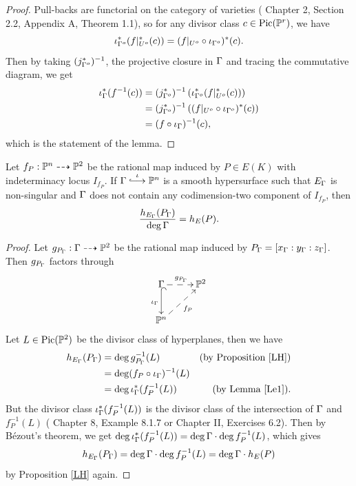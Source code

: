 \documentclass[12pt,reqno]{amsart}
\begin{document}
\begin{proof}
Pull-backs are functorial on the category of varieties (\cite{FIT} Chapter 2, Section 2.2, \cite{HAG} Appendix A, Theorem 1.1), so for any divisor class $c \in \operatorname{Pic}(\mathbb{P}^r)$, we have 
$$\iota_{\Gamma^o}^*(f|_{U^o}^*(c))=(f|_{U^o} \circ \iota_{\Gamma^o})^*(c). $$ Then by taking $(j_{\Gamma^o}^*)^{-1}$, the projective closure in $\Gamma$ and tracing the commutative diagram, we get
\begin{align*}
\iota_{\Gamma}^*(f^{-1}(c))&=(j_{\Gamma^o}^*)^{-1}\left(\iota_{\Gamma^o}^*(f|_{U^o}^*(c))\right) \\& = (j_{\Gamma^o}^*)^{-1}\left((f|_{U^o} \circ \iota_{\Gamma^o})^*(c)\right) \\ &= (f \circ \iota_\Gamma)^{-1}(c), \end{align*} which is the statement of the lemma.
\end{proof}

\begin{lemma} \label{leh}Let $f_P : \mathbb{P}^n \dashrightarrow \mathbb{P}^2$ be the rational map induced by $P \in E(K)$ with indeterminacy locus $I_{f_P}$. If $\G \stackrel{\iota}{\longhookrightarrow} \PP^n$ is a smooth hypersurface such that $E_\Gamma$ is non-singular and $\Gamma$ does not contain any codimension-two component of $I_{f_P}$, then 
\begin{equation}\frac{h_{E_\Gamma}(P_\Gamma)}{\deg \Gamma}= h_E(P). \label{E1}\end{equation}
\end{lemma}
\begin{proof} Let $g_{P_\Gamma} : \Gamma \dashrightarrow \mathbb{P}^2$ be the rational map induced by $P_\Gamma=[x_\Gamma: y_\Gamma: z_\Gamma]$. Then $g_{P_\Gamma}$ factors through
$$\xymatrix{
\G \ar@{-->}[r]^{g_{P_\G}} \ar@{^{(}->}[d]_{\iota_{\G}} 
&\PP^2  \\
\PP^n \ar@{-->}[ur]_{f_P} 
}$$
Let $L \in \operatorname{Pic}(\mathbb{P}^2)$ be the divisor class of hyperplanes, then we have 
\begin{align*}
h_{E_\Gamma}(P_\Gamma)&= \deg g_{P_\Gamma}^{-1}(L) & (\text{by Proposition \ref{LH}})\\
&=\deg (f_P \circ \iota_\Gamma)^{-1}(L)\\
&= \deg \iota_\Gamma^* (f_P^{-1}(L)) &(\text{by Lemma \ref{Le1}}).
\end{align*}
But the divisor class $\iota_\Gamma^* (f_P^{-1}(L))$ is the divisor class of the intersection of $\Gamma$ and $f_P^{-1}(L)$ (\cite{FIT} Chapter 8, Example 8.1.7 or \cite{HAG} Chapter II, Exercises 6.2). Then by B\'ezout's theorem, we get $\deg \iota_\Gamma^* (f_P^{-1}(L)) = \deg \Gamma \cdot \deg f_P^{-1}(L)$, which gives 
$$h_{E_\Gamma}(P_\Gamma)=\deg \Gamma \cdot \deg f_P^{-1}(L)=\deg \Gamma \cdot h_E(P) $$ by Proposition \ref{LH} again.
\end{proof}
\end{document}
